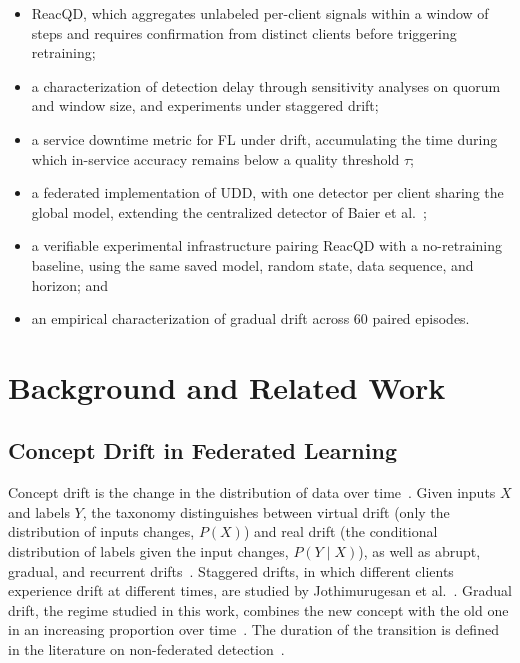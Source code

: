 \documentclass[conference]{IEEEtran}
\begin{document}
\begin{itemize}
    \item ReacQD, which aggregates unlabeled per-client signals within a window of steps and requires confirmation from distinct clients before triggering retraining;

    \item a characterization of detection delay through sensitivity analyses on quorum and window size, and experiments under staggered drift;

    \item a service downtime metric for FL under drift, accumulating the time during which in-service accuracy remains below a quality threshold $\tau$;

    \item a federated implementation of UDD, with one detector per client sharing the global model, extending the centralized detector of Baier et al.~\cite{baier2023};

    \item a verifiable experimental infrastructure pairing ReacQD with a no-retraining baseline, using the same saved model, random state, data sequence, and horizon; and

    \item an empirical characterization of gradual drift across 60 paired episodes.
\end{itemize}

\section{Background and Related Work}


\subsection{Concept Drift in Federated Learning}
Concept drift is the change in the distribution of data over time~\cite{criado2022,mahdi2025}. Given inputs $X$ and labels $Y$, the taxonomy distinguishes between virtual drift (only the distribution of inputs changes, $P(X)$) and real drift (the conditional distribution of labels given the input changes, $P(Y\mid X)$), as well as abrupt, gradual, and recurrent drifts~\cite{mahdi2025}. Staggered drifts, in which different clients experience drift at different times, are studied by Jothimurugesan et al.~\cite{jothimurugesan2023}. Gradual drift, the regime studied in this work, combines the new concept with the old one in an increasing proportion over time~\cite{casado2022}. The duration of the transition is defined in the literature on non-federated detection~\cite{poenaru2022,cerqueira2026}.
\end{document}
